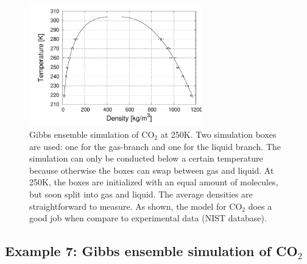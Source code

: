 \begin{figure}[t]
  \centering
  \includegraphics[width=7.5cm]{./Examples/GibbsCO2.pdf}
  \caption{Gibbs ensemble simulation of CO$_2$ at 250K. Two simulation boxes are used: one for the gas-branch and one for the liquid branch. The simulation can
           only be conducted below a certain temperature because otherwise the boxes can swap between gas and liquid. At 250K, the boxes are initialized
           with an equal amount of molecules, but soon split into gas and liquid. The average densities are straightforward to measure. As shown, the
           model for CO$_2$ does a good job when compare to experimental data (NIST database).}
  \label{Fig: Gibbs CO2}
\end{figure}

\subsection*{Example 7: Gibbs ensemble simulation of CO$_2$}

